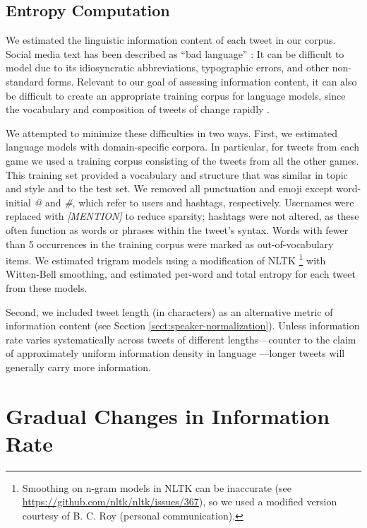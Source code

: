 \documentclass[11pt,letterpaper]{article}
\begin{document}
\subsection{Entropy Computation}

We estimated the linguistic information content of each tweet in our corpus. Social media text has been described as ``bad language'' \cite{eisenstein2013}: It can be difficult to model due to its idiosyncratic abbreviations, typographic errors, and other non-standard forms. Relevant to our goal of assessing information content, it can also be difficult to create an appropriate training corpus for language models, since the vocabulary and composition of tweets of change rapidly \cite{eisenstein2013}.

We attempted to minimize these difficulties in two ways.  First, we estimated language models with domain-specific corpora. In particular, for tweets from each game we used a training corpus consisting of the tweets from all the other games. This training set provided a vocabulary and structure that was similar in topic and style and to the test set.  We removed all punctuation and emoji except word-initial {\it @} and {\it \#}, which refer to users and hashtags, respectively.  Usernames were replaced with {\it [MENTION]} to reduce sparsity; hashtags were not altered, as these often function as words or phrases within the tweet's syntax.  Words with fewer than 5 occurrences in the training corpus were marked as out-of-vocabulary items. We estimated trigram models using a modification of NLTK \cite{bird2006}\footnote{Smoothing on n-gram models in NLTK can be inaccurate (see \url{https://github.com/nltk/nltk/issues/367}), so we used a modified version courtesy of B. C. Roy (personal communication).} with Witten-Bell smoothing, and estimated per-word and total entropy for each tweet from these models.

Second, we included tweet length (in characters) as an alternative metric of information content (see Section \ref{sect:speaker-normalization}). Unless information rate varies systematically across tweets of different lengths---counter to the claim of approximately uniform information density in language \cite{genzel2002,levy2007}---longer tweets will generally carry more information. 


\section{Gradual Changes in Information Rate}
\end{document}
